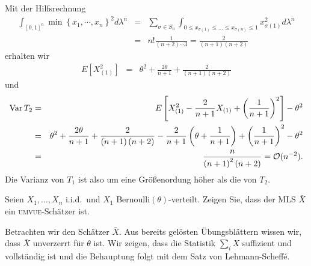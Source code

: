Mit der Hilfsrechnung
\begin{eqnarray}
	\int_{[0,1]^n}^{} \min\left\{ x_1,\cdots,x_n \right\}^2 d\lambda^n 
	&=& \sum_{\sigma\in S_n}^{} \int_{0\leq x_{\sigma(1)}\leq \ldots \leq x_{\sigma(n)}\leq 1} x_{\sigma(1)}^2 d\lambda^n \\
	&=& n! \frac{1}{\left( n+2 \right)\cdots 3} = \frac{2}{\left( n+1 \right)\left( n+2 \right)}
\end{eqnarray}
erhalten wir
\begin{eqnarray}
	E\left[ X_{(1)}^2 \right] &=& \theta^2 +  \frac{2\theta}{n+1} + \frac{2}{\left( n+1 \right)\left( n+2 \right)}
\end{eqnarray}
und
\begin{eqnarray}
	\operatorname{Var} T_2 &=& E \left[ X_{(1)}^2 - \frac{2}{n+1}X_{(1)}+ \left( \frac{1}{n+1} \right)^2 \right] -\theta^2 \\
	&=& \theta^2 + \frac{2\theta}{n+1} + \frac{2}{\left( n+1 \right)\left( n+2 \right)} 
	- \frac{2}{n+1}\left( \theta + \frac{1}{n+1} \right) + \left( \frac{1}{n+1} \right)^2 -\theta^2 \\
	&=& \frac{n}{\left( n+1 \right)^2 \left( n+2 \right)} = \mathcal O (n^{-2}).
\end{eqnarray}
Die Varianz von $T_1$ ist also um eine Größenordung höher als die von $T_2$.




Seien $X_1,\ldots,X_n$ i.i.d.\ und $X_1$ Bernoulli$(\theta)$-verteilt. Zeigen
Sie, dass der MLS $\bar X$ ein \textsc{umvue}-Schätzer ist.

\solution Betrachten wir den Schätzer $\bar X$. Aus bereits
gelösten Übungsblättern wissen wir, dass $\bar X$ unverzerrt für $\theta$ ist.
Wir zeigen, dass die Statistik $\sum_{i}^{} X$ suffizient und vollständig ist
und die Behauptung folgt mit dem Satz von Lehmann-Scheff\'e. 

